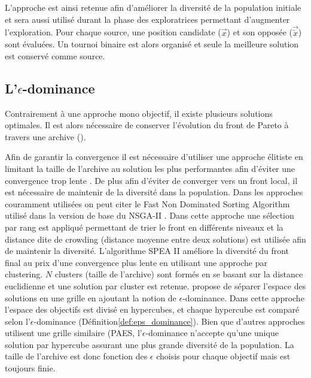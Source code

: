 L’approche est ainsi retenue afin d’améliorer la diversité de la population initiale
et sera aussi utilisé durant la phase des exploratrices permettant d’augmenter l’exploration.
Pour chaque source, une position candidate ($\vec{x}$) et son opposée ($\vec{\check{x}}$) sont évaluées.
Un tournoi binaire est alors organisé et seule la meilleure solution est conservé comme source.


\subsection[L’epsilon-dominance]{L’$\epsilon$-dominance} %
\label{sub:l_epsilon_dominance}
Contrairement à une approche mono objectif, il existe plusieurs solutions optimales.
Il est alors nécessaire de conserver l’évolution du front de Pareto à travers une
archive ().


Afin de garantir la convergence il est nécessaire d’utiliser une approche élitiste
en limitant la taille de l’archive au solution les plus performantes afin d’éviter
une convergence trop lente \parencite{Zitzler2000173}. De plus afin d’éviter de converger vers un front local,
il est nécessaire de maintenir de la diversité dans la population.
Dans les approches couramment utilisées on peut citer le Fast Non Dominated Sorting Algorithm utilisé dans la version
de base du NSGA-II \parencite{Deb2002182}. Dans cette approche une sélection par rang
est appliqué permettant de trier le front en différents niveaux et la distance dite
de crowding (distance moyenne entre deux solutions) est utilisée afin de maintenir la diversité.
L’algorithme SPEA II améliore la diversité du front final au prix d’une convergence
plus lente en utilisant une approche par clustering. $N$ clusters (taille de l’archive)
sont formés en se basant sur la distance euclidienne et une solution par cluster
est retenue.
\cite{Laumanns2002263} propose de séparer l’espace des solutions en une grille en ajoutant la notion
de $\epsilon$-dominance. Dans cette approche l’espace des objectifs est divisé en hypercubes,
et chaque hypercube est comparé selon l’$\epsilon$-dominance (Définition\ref{def:eps_dominance}).
Bien que d’autres approches utilisent une grille similaire (PAES, \cite{Knowles2000149}
l’$\epsilon$-dominance n’accepte qu’une unique solution par hypercube assurant une
plus grande diversité de la population. La taille de l’archive est donc fonction
des $\epsilon$ choisis pour chaque objectif mais est toujours finie.


